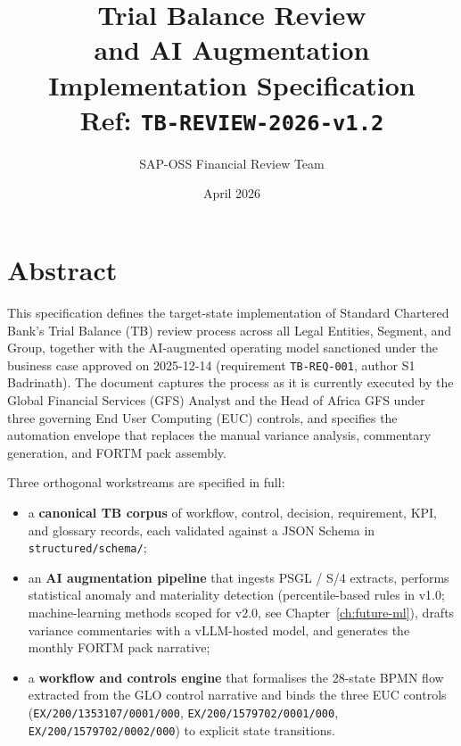 \documentclass[11pt,a4paper,twoside]{report}
\newcommand{\corpus}{}
\begin{document}
\title{\vspace{-2em}\Large Trial Balance Review \\
\textbf{and AI Augmentation} \\
\large Implementation Specification \\
\small Ref: \texttt{TB-REVIEW-2026-v1.2}}
\author{SAP-OSS Financial Review Team}
\date{April 2026}

\maketitle


\chapter*{Abstract}

This specification defines the target-state implementation of Standard
Chartered Bank's Trial Balance (TB) review process across all Legal
Entities, Segment, and Group, together with the AI-augmented operating
model sanctioned under the business case approved on 2025-12-14
(requirement \texttt{TB-REQ-001}, author S1 Badrinath). The document
captures the process as it is currently executed by the Global Financial
Services (GFS) Analyst and the Head of Africa GFS under three governing
End User Computing (EUC) controls, and specifies the automation
envelope that replaces the manual variance analysis, commentary
generation, and FORTM pack assembly.

Three orthogonal workstreams are specified in full:

\begin{itemize}
\item a \textbf{canonical TB corpus} of workflow, control, decision,
requirement, KPI, and glossary records, each validated against
a JSON Schema in \corpus\texttt{structured/schema/};
\item an \textbf{AI augmentation pipeline} that ingests
PSGL / S/4 extracts, performs statistical anomaly and materiality
detection (percentile-based rules in v1.0; machine-learning
methods scoped for v2.0, see Chapter~\ref{ch:future-ml}),
drafts variance commentaries with a vLLM-hosted model, and
generates the monthly FORTM pack narrative;
\item a \textbf{workflow and controls engine} that formalises the
28-state BPMN flow extracted from the GLO control narrative
and binds the three EUC controls (\texttt{EX/200/1353107/0001/000},
\texttt{EX/200/1579702/0001/000}, \texttt{EX/200/1579702/0002/000})
to explicit state transitions.
\end{itemize}
\end{document}
